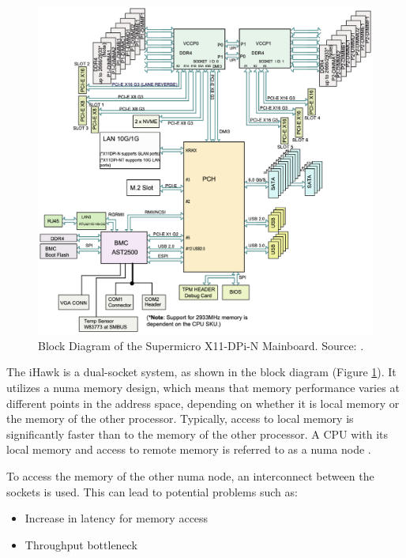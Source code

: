 \begin{figure}[ht!]
    \centering
    \includegraphics[width=1\linewidth]{figures/method/image1.png}
    \caption[Block Diagram of the Supermicro X11-DPi-N Mainboard]{Block Diagram of the Supermicro X11-DPi-N Mainboard. Source: \cite{setup05}.}
    \label{fig:BlockDiagrIHawk}
\end{figure}

The iHawk is a dual-socket system, as shown in the block diagram (Figure \ref{fig:BlockDiagrIHawk}). It utilizes a \ac{numa} memory design, which means that memory performance varies at different points in the address space, depending on whether it is local memory or the memory of the other processor. Typically, access to local memory is significantly faster than to the memory of the other processor. A \ac{CPU} with its local memory and access to remote memory is referred to as a \ac{numa} node \cite{setup06}.

To access the memory of the other \ac{numa} node, an interconnect between the sockets is used. This can lead to potential problems such as:

\begin{itemize}
\item Increase in latency for memory access
\item Throughput bottleneck
\end{itemize}

